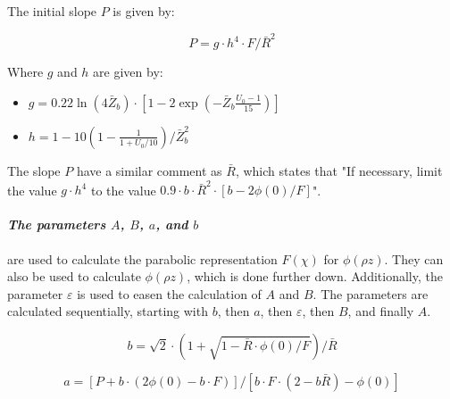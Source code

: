 The initial slope $P$ is given by:

\begin{equation}
    \label{eq:theory:quantitative:pap:slope_P}
    P = g \cdot h^4 \cdot F/\bar{R}^2
\end{equation}

Where $g$ and $h$ are given by:

\begin{itemize}
    \item $ g = 0.22 \ln(4 \bar{Z}_b) \cdot [1 - 2 \exp(-\bar{Z}_b \frac{U_0 - 1}{15})] $
    \item $ h = 1 - 10(1-\frac{1}{1+ U_0/10})/\bar{Z}_b^2 $
\end{itemize}


The slope $P$ have a similar comment as $\bar{R}$, which states that "If necessary, limit the value $ g \cdot h^4 $ to the value $ 0.9 \cdot b\cdot  \bar{R}^2 \cdot [b - 2 \phi(0)/F] $".










\paragraph{\emph{The parameters $A$, $B$, $a$, and $b$}} are used to calculate the parabolic representation $F(\chi)$ for $\phi(\rho z)$.
They can also be used to calculate $\phi(\rho z)$, which is done further down.
Additionally, the parameter $\varepsilon$ is used to easen the calculation of $A$ and $B$.
The parameters are calculated sequentially, starting with $b$, then $a$, then $\varepsilon$, then $B$, and finally $A$.


\begin{equation}
    \label{eq:theory:quantitative:pap:small_b}
    b = \sqrt{2} \cdot (1 + \sqrt{1 - \bar{R} \cdot \phi(0) / F})/\bar{R}
\end{equation}

\begin{equation}
    \label{eq:theory:quantitative:pap:small_a}
    a = [P + b \cdot (2\phi(0) - b \cdot F)] / [b \cdot F \cdot (2 - b \bar{R}) - \phi(0)]
\end{equation}

